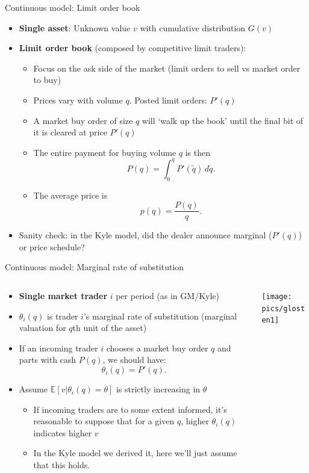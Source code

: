 \documentclass[english,10pt
,aspectratio=169
]{beamer}
\begin{document}
\begin{frame}{Continuous model: Limit order book}
\begin{itemize}
	\item \textbf{Single asset}: Unknown value $v$ with cumulative distribution  $G(v)$
	\item \textbf{Limit order book} (composed by competitive limit traders): 
	\begin{itemize}
		\item Focus on the ask side of the market (limit orders to sell vs market order to buy)
		\item Prices vary with volume $q$. Posted limit orders: $P'(q)$
		\item A market buy order of size $q$ will `walk up the book' until the final bit of it is cleared at price $P'(q)$
		\item The entire payment for buying volume $q$ is then
		\[
		P(q) = \int_0^q P'(\tilde{q}) \, d\tilde{q}.
		\]
		\item The average price is 
		\[
		p(q) = \frac{P(q)}{q}.
		\]
	\end{itemize}
	\pause
	\item Sanity check: in the Kyle model, did the dealer announce \alert{marginal ($P'(q)$)} or  price schedule?
\end{itemize}
\end{frame}


\begin{frame}{Continuous model: Marginal rate of substitution}
	\begin{columns}
		\begin{column}{0.7\linewidth}
			\begin{itemize}
				\item \textbf{Single market trader} $i$ per period (as in GM/Kyle)
				\item $\theta_i(q)$ is trader $i$'s marginal rate of substitution (marginal valuation for $q$th unit of the asset)
				\item If an incoming trader $i$ chooses a market buy order $q$ and parts with cash $P(q)$, we should have: \[\theta_i(q) = P'(q).\]
				\item Assume $\mathbb{E}[v|\theta_i(q) = \theta]$ is strictly increasing in $\theta$
				\begin{itemize}
					\item If incoming traders are to some extent informed, it's reasonable to suppose that for a given $q$, higher $\theta_i(q)$ indicates higher $v$
					\item In the Kyle model we derived it, here we'll just assume that this holds.
				\end{itemize}
			\end{itemize}
		\end{column}
		\begin{column}{0.3\linewidth}
			\texttt{[image: pics/glosten1]}
			\vspace{3em}
		\end{column}
	\end{columns}
\end{frame}
\end{document}
